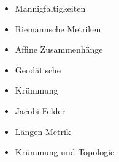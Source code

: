 \begin{module}
\begin{learningoutcomes}
\end{learningoutcomes}

\begin{content}
\begin{itemize}\item Mannigfaltigkeiten  \item Riemannsche Metriken  \item Affine Zusammenhänge  \item Geodätische  \item Krümmung  \item Jacobi-Felder  \item Längen-Metrik  \item Krümmung und Topologie  \end{itemize}
\end{content}



\end{module}

